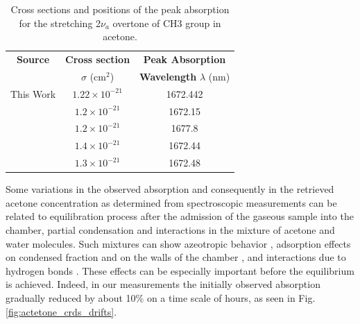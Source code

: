 \documentclass[12pt]{report}
\begin{document}
	\begin{table}[H]
		\caption{ Cross sections and positions of the peak absorption for the stretching 2$\nu_a$ overtone of CH3 group in acetone.}
		\begin{center}
			\begin{tabular}{|c|c|c|}
				\hline
				\textbf{Source} & \textbf{Cross section} & \textbf{Peak Absorption} \\
				& $\sigma$ (cm$^2$) &\textbf{Wavelength} $\lambda$ (nm) \\
				\hline
				This Work \cite{mine_acetone} & $1.22\times10^{-21}$ & 1672.442 \\
				\hline
				\cite{Pearle_2008} & $1.2\times 10^{-21}$ & 1672.15 \\
				\hline
				\cite{Wang_2004} & $1.2\times 10^{-21}$ & 1677.8 \\
				\hline
				\cite{pnnl_database_gas_phase} & $1.4\times 10^{-21}$ & 1672.44 \\
				\hline
				\cite{Denzer_2010} & $1.3\times 10^{-21}$ & 1672.48 \\
				\hline
			\end{tabular}
		\end{center}
		\label{tbl:compare_lit}
	\end{table}
	
	Some variations in the observed absorption and consequently in the retrieved acetone concentration as determined from spectroscopic measurements can be related to equilibration process after the admission of the gaseous sample into the chamber, partial condensation and interactions in the mixture of acetone and water molecules. Such mixtures can show azeotropic behavior \cite{Mahdi_azeotrope}, adsorption effects on condensed fraction and on the walls of the chamber \cite{Duan_1993, CHEN_2001}, and interactions due to hydrogen bonds \cite{COUTINHO_1999, Jean-Joseph_2003, Jean-Joseph_2003_molModels}. These effects can be especially important before the equilibrium is achieved. Indeed, in our measurements the initially observed absorption gradually reduced by about 10\% on a time scale of hours, as seen in Fig. \ref{fig:actetone_crds_drifts}.
	
\end{document}

